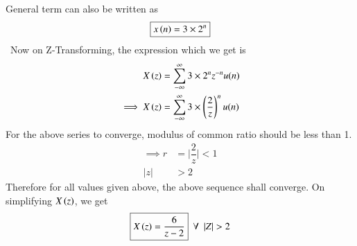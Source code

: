 \documentclass[journal,12pt,twocolumn]{IEEEtran}
\theoremstyle{remark}
\begin{document}
General term can also be written as\
\begin{align}
\boxed{x\left(n\right) = 3\times2^{n}}
\end{align}\
Now on Z-Transforming, the expression which we get is\\
\begin{align}
X\left(z\right) &= \sum_{-\infty}^{\infty}3\times2^{n}z^{-n}u(n)   \\
\implies X\left(z\right) &= \sum_{-\infty}^{\infty}3\times\left(\dfrac{2}{z}\right)^{n}u(n)
\end{align}
For the above series to converge, modulus of common ratio should be less than 1.
\begin{align}
\implies r &= \bigg|\dfrac{2}{z}\bigg|<1\\
        |z|&> 2
\end{align}
Therefore for all values given above, the above sequence shall converge.
On simplifying $X\left(z\right)$, we get
\begin{align}
\boxed{X\brak{z}=\dfrac{6}{z-2}}\,\,\,  \forall \,\,\, |Z|>2 
\end{align}
\end{document}
